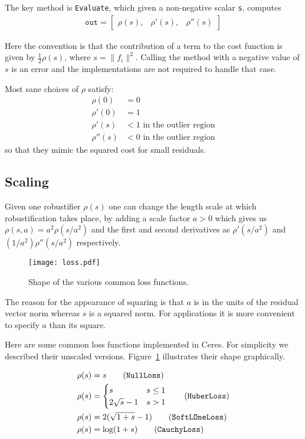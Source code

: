 The key method is \texttt{Evaluate}, which given a non-negative scalar \texttt{s}, computes
\begin{align}
	\texttt{out} = \begin{bmatrix}\rho(s), & \rho'(s), & \rho''(s)\end{bmatrix}
\end{align}

Here the convention is that the contribution of a term to the cost function is given by $\frac{1}{2}\rho(s)$,  where $s = \|f_i\|^2$. Calling the method with a negative value of $s$ is an error and the implementations are not required to handle that case.

Most sane choices of $\rho$ satisfy:
\begin{align}
   \rho(0) &= 0\\
   \rho'(0) &= 1\\
   \rho'(s) &< 1 \text{ in the outlier region}\\
   \rho''(s) &< 0 \text{ in the outlier region}
\end{align}
so that they mimic the squared cost for small residuals.

\subsection{Scaling}
Given one robustifier $\rho(s)$
 one can change the length scale at which robustification takes
 place, by adding a scale factor $a > 0$ which gives us $\rho(s,a) = a^2 \rho(s / a^2)$ and the first and second derivatives as $\rho'(s / a^2)$ and   $(1 / a^2) \rho''(s / a^2)$ respectively.


\begin{figure}[hbt]
\texttt{[image: loss.pdf]}
\caption{Shape of the various common loss functions.}
\label{fig:loss}
\end{figure}


The reason for the appearance of squaring is that $a$ is in the units of the residual vector norm whereas $s$ is a squared norm. For applications it is more convenient to specify $a$ than
its square.

Here are some common loss functions implemented in Ceres. For simplicity we described their unscaled versions. Figure~\ref{fig:loss} illustrates their shape graphically.

\begin{align}
		\rho(s)&=s \tag{\texttt{NullLoss}}\\
		\rho(s) &= \begin{cases}
		       s & s \le 1\\
		       2 \sqrt{s} - 1 & s > 1
	           \end{cases} \tag{\texttt{HuberLoss}}\\
		\rho(s) &= 2 (\sqrt{1+s} - 1) \tag{\texttt{SoftLOneLoss}}\\
		\rho(s) &= \log(1 + s) \tag{\texttt{CauchyLoss}}
\end{align}

